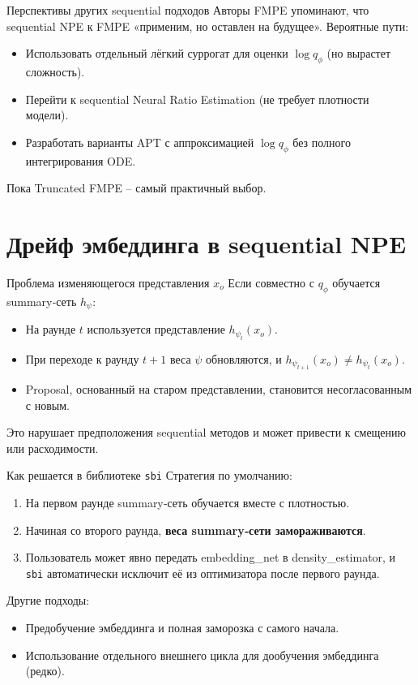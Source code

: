 \documentclass[10pt,aspectratio=169]{beamer}
\begin{document}
\begin{frame}{Перспективы других sequential подходов}
Авторы FMPE упоминают, что sequential NPE к FMPE «применим, но оставлен на будущее». Вероятные пути:
\begin{itemize}
    \item Использовать отдельный лёгкий суррогат для оценки $\log q_\phi$ (но вырастет сложность).
    \item Перейти к sequential Neural Ratio Estimation (не требует плотности модели).
    \item Разработать варианты APT с аппроксимацией $\log q_\phi$ без полного интегрирования ODE.
\end{itemize}
Пока Truncated FMPE – самый практичный выбор.
\end{frame}

\section{Дрейф эмбеддинга в sequential NPE}

\begin{frame}{Проблема изменяющегося представления $x_o$}
Если совместно с $q_\phi$ обучается summary‑сеть $h_\psi$:
\begin{itemize}
    \item На раунде $t$ используется представление $h_{\psi_t}(x_o)$.
    \item При переходе к раунду $t+1$ веса $\psi$ обновляются, и $h_{\psi_{t+1}}(x_o) \neq h_{\psi_t}(x_o)$.
    \item Proposal, основанный на старом представлении, становится несогласованным с новым.
\end{itemize}
\pause
Это нарушает предположения sequential методов и может привести к смещению или расходимости.
\end{frame}

\begin{frame}{Как решается в библиотеке \texttt{sbi}}
Стратегия по умолчанию:
\begin{enumerate}
    \item На первом раунде summary‑сеть обучается вместе с плотностью.
    \item Начиная со второго раунда, \textbf{веса summary‑сети замораживаются}.
    \item Пользователь может явно передать embedding\_net в density\_estimator, и \texttt{sbi} автоматически исключит её из оптимизатора после первого раунда.
\end{enumerate}
\pause
Другие подходы:
\begin{itemize}
    \item Предобучение эмбеддинга и полная заморозка с самого начала.
    \item Использование отдельного внешнего цикла для дообучения эмбеддинга (редко).
\end{itemize}
\end{frame}
\end{document}

